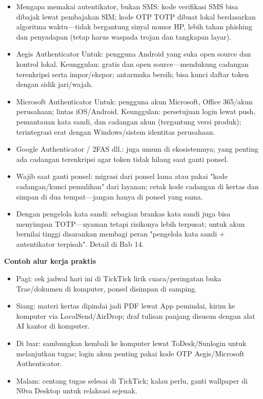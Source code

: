 \begin{itemize}
  \item Mengapa memakai autentikator, bukan SMS: kode verifikasi SMS bisa dibajak lewat pembajakan SIM; kode OTP TOTP dibuat lokal berdasarkan algoritma waktu—tidak bergantung sinyal nomor HP, lebih tahan phishing dan penyadapan (tetap harus waspada trojan dan tangkapan layar).
  \item Aegis Authenticator Untuk: pengguna Android yang suka open source dan kontrol lokal. Keunggulan: gratis dan open source—mendukung cadangan terenkripsi serta impor/ekspor; antarmuka bersih; bisa kunci daftar token dengan sidik jari/wajah.
  \item Microsoft Authenticator Untuk: pengguna akun Microsoft, Office 365/akun perusahaan; lintas iOS/Android. Keunggulan: persetujuan login lewat push, pemantauan kata sandi, dan cadangan akun (tergantung versi produk); terintegrasi erat dengan Windows/sistem identitas perusahaan.
  \item Google Authenticator / 2FAS dll.: juga umum di ekosistemnya; yang penting ada cadangan terenkripsi agar token tidak hilang saat ganti ponsel.
  \item Wajib saat ganti ponsel: migrasi dari ponsel lama atau pakai "kode cadangan/kunci pemulihan" dari layanan; cetak kode cadangan di kertas dan simpan di dua tempat—jangan hanya di ponsel yang sama.
  \item Dengan pengelola kata sandi: sebagian brankas kata sandi juga bisa menyimpan TOTP—nyaman tetapi risikonya lebih terpusat; untuk akun bernilai tinggi disarankan membagi peran "pengelola kata sandi + autentikator terpisah". Detail di Bab 14.
\end{itemize}


\textbf{Contoh alur kerja praktis}\par

\begin{itemize}
  \item Pagi: cek jadwal hari ini di TickTick lirik cuaca/peringatan buka Trae/dokumen di komputer, ponsel disimpan di samping.
  \item Siang: materi kertas dipindai jadi PDF lewat App pemindai, kirim ke komputer via LocalSend/AirDrop; draf tulisan panjang disusun dengan alat AI kantor di komputer.
  \item Di luar: sambungkan kembali ke komputer lewat ToDesk/Sunlogin untuk melanjutkan tugas; login akun penting pakai kode OTP Aegis/Microsoft Authenticator.
  \item Malam: centang tugas selesai di TickTick; kalau perlu, ganti wallpaper di N0va Desktop untuk relaksasi sejenak.
\end{itemize}

